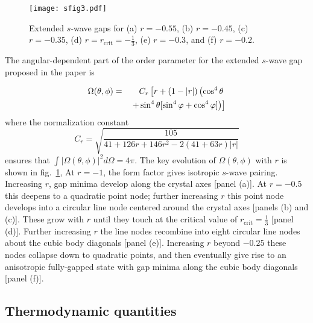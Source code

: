 \documentclass[aps,pra,reprint,superscriptaddress,floatfix]{revtex4-2}
\begin{document}
\begin{figure}[b]
\texttt{[image: sfig3.pdf]}%
\caption{Extended $s$-wave gaps for (a) $r=-0.55$, (b) $r=-0.45$, (c) $r=-0.35$, (d) $r=r_\text{crit}=-\frac{1}{3}$, (e) $r=-0.3$, and (f) $r=-0.2$.}
\label{swavesupp}
\end{figure}

The  angular-dependent part of the order parameter for the extended $s$-wave gap proposed in the paper is

\begin{eqnarray} \label{eq:extswave}
    \Omega(\theta,\phi) & = & C_r\left[r  + (1-|r|)\left( \cos^4\theta  \right. \right. \notag \\
    && \left.  \left. +\sin^4\theta[\sin^4\varphi + \cos^4\varphi]\right)\right] 
\end{eqnarray}
where the normalization constant
\begin{equation}
    C_r = \sqrt{\frac{105}{41 + 126 r + 146 r^2 - 2 (41 + 63 r)|r|}}
\end{equation}
ensures that $\int|\Omega(\theta,\phi)|^2 d\Omega = 4\pi$. The key evolution of $\Omega(\theta,\phi)$ with $r$ is shown in fig.~\ref{swavesupp}, At $r=-1$, the form factor gives isotropic $s$-wave pairing. Increasing $r$, gap minima develop along the crystal axes [panel (a)]. At $r=-0.5$ this deepens to a quadratic point node; further increasing $r$ this point node develops into a circular line node centered around the crystal axes [panels (b) and (c)]. These grow with $r$ until they touch at the critical value of $r_{\text{crit}}=\frac{1}{3}$ [panel (d)]. Further increasing $r$ the line nodes recombine into eight circular line nodes about the cubic body diagonals [panel (e)]. Increasing $r$ beyond $-0.25$ these nodes collapse down to quadratic points, and then eventually give rise to an anisotropic fully-gapped state with gap minima along the cubic body diagonals [panel (f)].

\subsection{Thermodynamic quantities}
\end{document}
